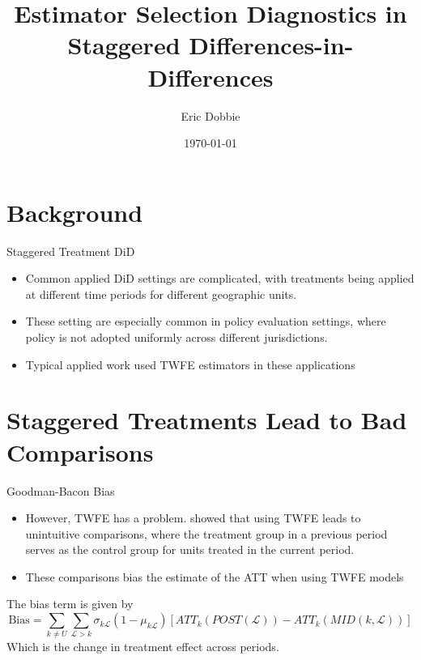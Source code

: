 \documentclass[11pt]{beamer}
\title[Estimator Selection]{Estimator Selection Diagnostics in Staggered Differences-in-Differences}
\author[Eric Dobbie]{Eric Dobbie}
\institute[Emory]{Emory University\\Department of Political Science}
\date{\today}
\begin{document}
\begin{frame}\titlepage
\end{frame}

\section{Background}

\begin{frame}{Staggered Treatment DiD}
    \begin{itemize}
        \item Common applied DiD settings are complicated, with treatments being applied at different time periods for different geographic units.
        \item These setting are especially common in policy evaluation settings, where policy is not adopted uniformly across different jurisdictions.
        \item Typical applied work used TWFE estimators in these applications
    \end{itemize}
\end{frame}

\section{Staggered Treatments Lead to Bad Comparisons}

\begin{frame}{Goodman-Bacon Bias}
    \begin{itemize}
        \item However, TWFE has a problem. \textcite{goodman2021difference} showed that using TWFE leads to unintuitive comparisons, where the treatment group in a previous period serves as the control group for units treated in the current period.
        \item These comparisons bias the estimate of the ATT when using TWFE models
    \end{itemize}

    The bias term is given by 
    \begin{equation}\label{eq:biastwfe}
        \text{Bias} = \sum_{k \not = U} \sum_{\mathcal{L} > k} \sigma_{k \mathcal{L}} (1 - \mu_{k\mathcal{L}})[ATT_k(POST(\mathcal{L})) - ATT_k(MID(k,\mathcal{L}))]
    \end{equation}
    Which is the change in treatment effect across periods.
\end{frame}
\end{document}
